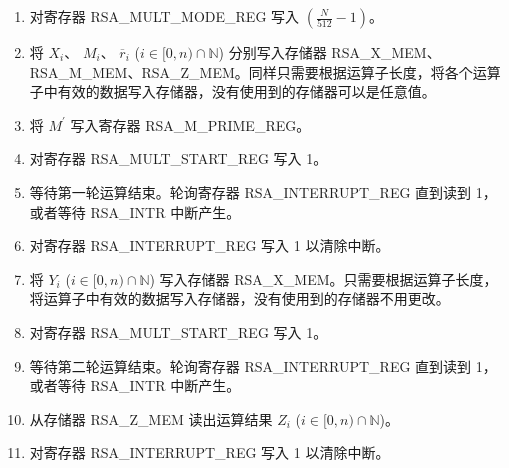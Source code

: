 \documentclass[main\_\_CN.tex]{subfiles}
\begin{document}
\begin{enumerate}

    \item 对寄存器 RSA\_MULT\_MODE\_REG 写入 \begin{math}( \frac{N}{512} - 1 )\end{math}。

    \item 将
        \begin{math}X_{i}\end{math}、
        \begin{math}M_{i}\end{math}、
        \begin{math}\overline{r}_{i}\end{math}
        (\begin{math}i \in [0,n) \cap \mathbb{N}\end{math})
        分别写入存储器 RSA\_X\_MEM、RSA\_M\_MEM、RSA\_Z\_MEM。同样只需要根据运算子长度，将各个运算子中有效的数据写入存储器，没有使用到的存储器可以是任意值。
        
    \item 将 \begin{math}M^{\prime}\end{math} 写入寄存器 RSA\_M\_PRIME\_REG。

    \item 对寄存器 RSA\_MULT\_START\_REG 写入 1。

    \item 等待第一轮运算结束。轮询寄存器 RSA\_INTERRUPT\_REG 直到读到 1，或者等待 RSA\_INTR 中断产生。
        
    \item 对寄存器 RSA\_INTERRUPT\_REG 写入 1 以清除中断。

    \item 将
        \begin{math}Y_{i}\end{math}
        (\begin{math}i \in [0,n) \cap \mathbb{N}\end{math})
        写入存储器 RSA\_X\_MEM。只需要根据运算子长度，将运算子中有效的数据写入存储器，没有使用到的存储器不用更改。

    \item 对寄存器 RSA\_MULT\_START\_REG 写入 1。

    \item 等待第二轮运算结束。轮询寄存器 RSA\_INTERRUPT\_REG 直到读到 1，或者等待 RSA\_INTR 中断产生。
    
    \item 从存储器 RSA\_Z\_MEM 读出运算结果 \begin{math}Z_{i}\end{math}
        (\begin{math}i \in [0,n) \cap \mathbb{N}\end{math})。

    \item 对寄存器 RSA\_INTERRUPT\_REG 写入 1 以清除中断。

\end{enumerate}
\end{document}
